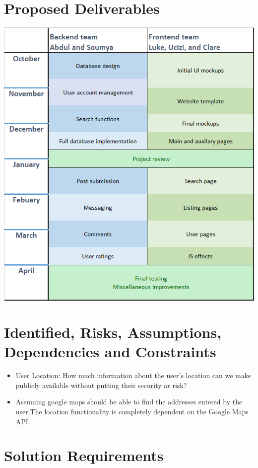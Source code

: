 \documentclass[12pt]{article}
\begin{document}
\pagebreak
\section{Proposed Deliverables}
\includegraphics[width=\textwidth]{images/plan.png}
\pagebreak

\section{Identified, Risks, Assumptions, Dependencies and Constraints}
\begin{itemize}
    \item User Location: How much information about the user's location can we
        make publicly available without putting their security ar risk?
    \item Assuming google maps should be able to find the addresses entered by
        the user.The location functionality is completely dependent on the
        Google Maps API.
\end{itemize}

\section{Solution Requirements}
\end{document}
